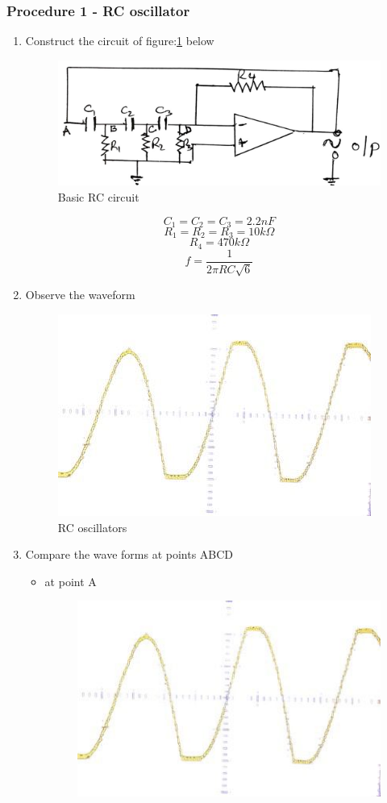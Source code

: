 \documentclass[12pt,a4paper]{article}
\begin{document}
    \subsubsection{Procedure 1 - RC oscillator}
    \begin{enumerate}
        \item Construct the circuit of figure:\ref{fig:1} below
        \begin{figure}[H]
            \centering
            \includegraphics[width=0.5\linewidth]{circuit1_1.jpeg}
            \caption{Basic RC circuit}
            \label{fig:1}
        \end{figure}
        $$ C_1 = C_2 = C_3 = 2.2nF$$
        $$ R_1 = R_2 = R_3 = 10k \Omega$$
        $$ R_4 = 470k \Omega$$
        $$ f = \frac{1}{2 \pi RC \sqrt{6}}$$
        \item Observe the waveform
        \begin{figure}[H]
            \centering
            \includegraphics[width=0.5\linewidth]{1.jpeg}
            \caption{RC oscillators}
            \label{fig:enter-label}
        \end{figure}
        \item Compare the wave forms at points ABCD
        \begin{itemize}
            \item at point A
            \begin{figure}[H]
            \centering
            \includegraphics[width=0.5\linewidth]{1.jpeg}

\end{figure}
\end{itemize}
\end{enumerate}
\end{document}
